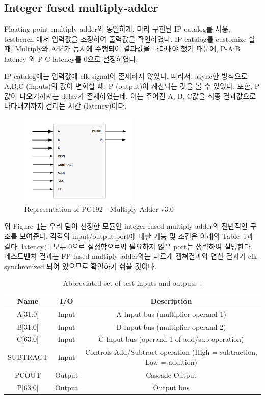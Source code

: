 \documentclass{article}
\begin{document}
\subsection{Integer fused multiply-adder}
Floating point multiply-adder와 동일하게, 미리 구현된 IP catalog를 사용, testbench 에서 입력값을 조정하여 출력값을 확인하였다. 
IP catalog를 customize 할 때, Multiply와 Add가 동시에 수행되어 결과값을 나타내야 했기 때문에, P-A:B latency 와 P-C latency를 0으로 설정하였다. 

IP catalog에는 입력값에 clk signal이 존재하지 않았다. 따라서, async한 방식으로 A,B,C (inputs)의 값이 변화할 때, P (output)이 계산되는 것을 볼 수 있었다. 또한, P값이 나오기까지는 delay가 존재하였는데, 이는 주어진 A, B, C값을 최종 결과값으로 나타내기까지 걸리는 시간 (latency)이다.

\begin{figure}[ht]
	\centering
	\includegraphics[width=0.5\textwidth]{fig/fig3.png}
	\caption{Representation of PG192 - Multiply Adder v3.0}
\label{fig3}
\end{figure}

위 Figure~\ref{fig3}는 우리 팀이 선정한 모듈인 integer fused multiply-adder의 전반적인 구조를 보여준다. 각각의 input/output port에 대한 기능 및 조건은 아래의 Table~\ref{tab2}과 같다. latency를 모두 0으로 설정함으로써 필요하지 않은 port는 생략하여 설명한다. 테스트벤치 결과는 FP fused multiply-adder와는 다르게 캡쳐결과와 연산 결과가 clk-synchronized 되어 있으므로 확인하기 쉬울 것이다.
\begin{table}[ht]
\renewcommand{\arraystretch}{0.9}
\begin{center}
\begin{tabular}{ |c | c | c |} 
 \hline
Name & I/O & Description \\ 
 \hline
A[31:0] &		Input		& 	A Input bus (multiplier operand 1)  \\
B[31:0] &	Input		&	B Input bus (multiplier operand 2)  \\
C[63:0] &		Input		& 	C Input bus (operand 1 of add/sub operation)  \\
SUBTRACT &		Input		& 	Controls Add/Subtract operation (High = subtraction, Low = addition)  \\
PCOUT &		Output		& 	Cascade Output   \\
P[63:0] &		Output		& 	Output bus \\
 \hline
\end{tabular}
\caption{Abbreviated set of test inputs and outputs~\cite{intmultiplyadder}.}\label{tab2}
\end{center}
\end{table}
\end{document}

